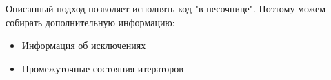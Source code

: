 \begin{frame}
\frametitle{\insertsection} 
\framesubtitle{\insertsubsection}
Описанный подход позволяет исполнять код "в песочнице". Поэтому можем собирать дополнительную информацию:
\begin{itemize}
	\item Информация об исключениях
	\item Промежуточные состояния итераторов
\end{itemize}
\end{frame}
